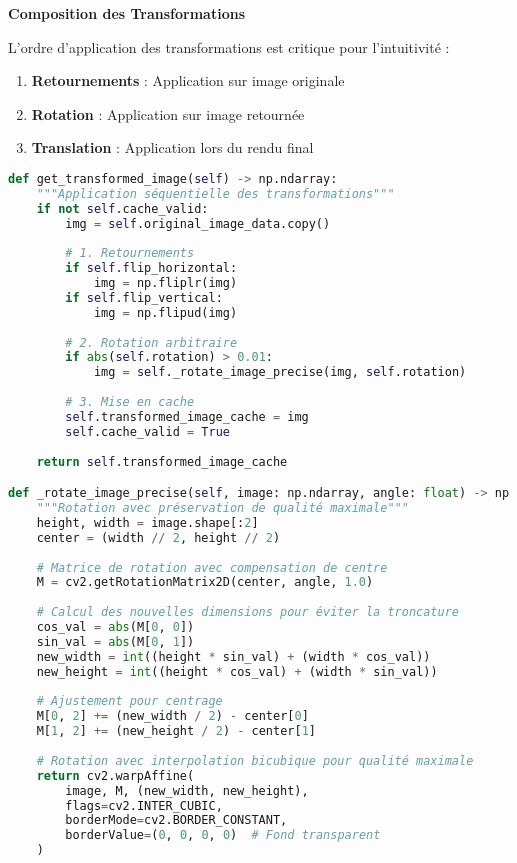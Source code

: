 \documentclass[12pt,a4paper]{report}
\begin{document}
\textbf{Composition des Transformations}

L'ordre d'application des transformations est critique pour l'intuitivité :

\begin{enumerate}
\item \textbf{Retournements} : Application sur image originale
\item \textbf{Rotation} : Application sur image retournée
\item \textbf{Translation} : Application lors du rendu final
\end{enumerate}

\begin{lstlisting}[language=Python]
def get_transformed_image(self) -> np.ndarray:
    """Application séquentielle des transformations"""
    if not self.cache_valid:
        img = self.original_image_data.copy()
        
        # 1. Retournements
        if self.flip_horizontal:
            img = np.fliplr(img)
        if self.flip_vertical:
            img = np.flipud(img)
        
        # 2. Rotation arbitraire
        if abs(self.rotation) > 0.01:
            img = self._rotate_image_precise(img, self.rotation)
        
        # 3. Mise en cache
        self.transformed_image_cache = img
        self.cache_valid = True
    
    return self.transformed_image_cache

def _rotate_image_precise(self, image: np.ndarray, angle: float) -> np.ndarray:
    """Rotation avec préservation de qualité maximale"""
    height, width = image.shape[:2]
    center = (width // 2, height // 2)
    
    # Matrice de rotation avec compensation de centre
    M = cv2.getRotationMatrix2D(center, angle, 1.0)
    
    # Calcul des nouvelles dimensions pour éviter la troncature
    cos_val = abs(M[0, 0])
    sin_val = abs(M[0, 1])
    new_width = int((height * sin_val) + (width * cos_val))
    new_height = int((height * cos_val) + (width * sin_val))
    
    # Ajustement pour centrage
    M[0, 2] += (new_width / 2) - center[0]
    M[1, 2] += (new_height / 2) - center[1]
    
    # Rotation avec interpolation bicubique pour qualité maximale
    return cv2.warpAffine(
        image, M, (new_width, new_height),
        flags=cv2.INTER_CUBIC,
        borderMode=cv2.BORDER_CONSTANT,
        borderValue=(0, 0, 0, 0)  # Fond transparent
    )
\end{lstlisting}
\end{document}
